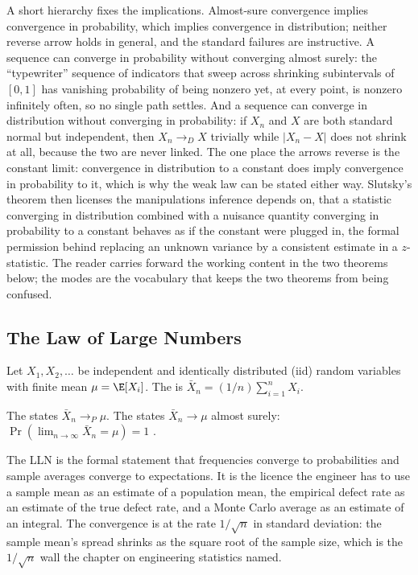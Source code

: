 A short hierarchy fixes the implications. Almost-sure convergence implies
convergence in probability, which implies convergence in distribution;
neither reverse arrow holds in general, and the standard failures are
instructive. A sequence can converge in probability without converging
almost surely: the ``typewriter'' sequence of indicators that sweep
across shrinking subintervals of $[0, 1]$ has vanishing probability of
being nonzero yet, at every point, is nonzero infinitely often, so no
single path settles. And a sequence can converge in distribution without
converging in probability: if $X_{n}$ and $X$ are both standard normal
but independent, then $X_{n} \to_{D} X$ trivially while $|X_{n} - X|$
does not shrink at all, because the two are never linked. The one place
the arrows reverse is the constant limit: convergence in distribution to
a constant does imply convergence in probability to it, which is why the
weak law can be stated either way. Slutsky's theorem then licenses the
manipulations inference depends on, that a statistic converging in
distribution combined with a nuisance quantity converging in probability
to a constant behaves as if the constant were plugged in, the formal
permission behind replacing an unknown variance by a consistent estimate
in a $z$-statistic. The reader carries forward the working content in the
two theorems below; the modes are the vocabulary that keeps the two
theorems from being confused.

\subsection{The Law of Large Numbers}

Let $X_{1}, X_{2}, \ldots$ be independent and identically
distributed (iid) random variables with finite mean
$\mu = \E[X_{i}]$. The  is
$\bar X_{n} = (1/n) \sum_{i=1}^{n} X_{i}$.

The  states $\bar X_{n} \to_{P}
\mu$. The  states $\bar X_{n}
\to \mu$ almost surely: $\Pr(\lim_{n \to \infty} \bar X_{n} = \mu)
= 1$ \cite[ch.~8]{text:ross-probability}.

The LLN is the formal statement that frequencies converge to
probabilities and sample averages converge to expectations. It is
the licence the engineer has to use a sample mean as an estimate of
a population mean, the empirical defect rate as an estimate of the
true defect rate, and a Monte Carlo average as an estimate of an
integral. The convergence is at the rate $1/\sqrt{n}$ in standard
deviation: the sample mean's spread shrinks as the square root of
the sample size, which is the $1/\sqrt{n}$ wall the chapter on
engineering statistics named.

